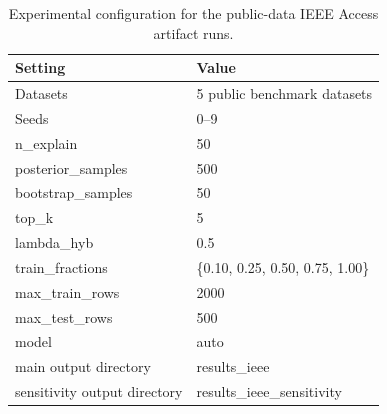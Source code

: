 \begin{table}[t]
\centering
\caption{Experimental configuration for the public-data IEEE Access artifact runs.}
\label{tab:experimental_configuration}
\begin{tabular}{l l}
        \hline
        Setting & Value \\
        \hline
        Datasets & 5 public benchmark datasets \\
        Seeds & 0--9 \\
        n\_explain & 50 \\
        posterior\_samples & 500 \\
        bootstrap\_samples & 50 \\
        top\_k & 5 \\
        lambda\_hyb & 0.5 \\
        train\_fractions & \{0.10, 0.25, 0.50, 0.75, 1.00\} \\
        max\_train\_rows & 2000 \\
        max\_test\_rows & 500 \\
        model & auto \\
        main output directory & results\_ieee \\
        sensitivity output directory & results\_ieee\_sensitivity \\
        \hline
\end{tabular}
\end{table}
